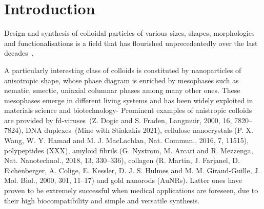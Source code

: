 \documentclass[journal=jacsat,manuscript=article]{achemso}
\begin{document}
\section{Introduction}



Design and synthesis of colloidal particles of various sizes, shapes, morphologies and functionalisations is a field that has flourished unprecedentedly over the last decades~\cite{Hueckel2021,Sacanna2013,Manoharan2015,Glotzer2007}. 


A particularly interesting class of colloids is constituted by nanoparticles of anisotropic shape, whose 
phase diagram is enriched by mesophases such as nematic, smectic, uniaxial columnar phases among many other ones.
These mesophases emerge in different living systems and has been widely exploited in materials science and 
biotechnology-  Prominent examples of anistropic colloids are provided by fd-viruses~(Z. Dogic and S. Fraden,
Langmuir, 2000, 16, 7820–7824), DNA duplexes~(Mine with Stiakakis 2021), cellulose nanocrystals (P. X. Wang, W. Y.
Hamad and M. J. MacLachlan, Nat. Commun., 2016, 7, 11515), polypeptides (XXX), amyloid fibrils (G. Nystrom, M. Arcari
 and R. Mezzenga, Nat. Nanotechnol., 2018, 13, 330–336), collagen (R. Martin, J. Farjanel, D. Eichenberger, A.
Colige, E. Kessler, D. J. S. Hulmes and M. M. Giraud-Guille, J. Mol. Biol., 2000, 301, 11–17) and gold nanorods 
(AuNRs). Latter ones have proven to be extremely successful when 
medical applications are foreseen, due to their high  biocompatibility and simple 
and versatile synthesis. 
\end{document}
